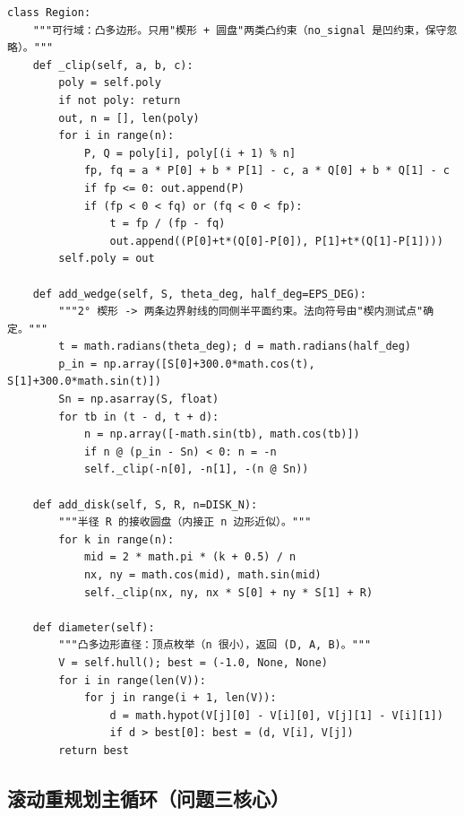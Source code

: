 \begin{verbatim}
class Region:
    """可行域：凸多边形。只用"楔形 + 圆盘"两类凸约束（no_signal 是凹约束，保守忽略）。"""
    def _clip(self, a, b, c):
        poly = self.poly
        if not poly: return
        out, n = [], len(poly)
        for i in range(n):
            P, Q = poly[i], poly[(i + 1) % n]
            fp, fq = a * P[0] + b * P[1] - c, a * Q[0] + b * Q[1] - c
            if fp <= 0: out.append(P)
            if (fp < 0 < fq) or (fq < 0 < fp):
                t = fp / (fp - fq)
                out.append((P[0]+t*(Q[0]-P[0]), P[1]+t*(Q[1]-P[1])))
        self.poly = out

    def add_wedge(self, S, theta_deg, half_deg=EPS_DEG):
        """2° 楔形 -> 两条边界射线的同侧半平面约束。法向符号由"楔内测试点"确定。"""
        t = math.radians(theta_deg); d = math.radians(half_deg)
        p_in = np.array([S[0]+300.0*math.cos(t), S[1]+300.0*math.sin(t)])
        Sn = np.asarray(S, float)
        for tb in (t - d, t + d):
            n = np.array([-math.sin(tb), math.cos(tb)])
            if n @ (p_in - Sn) < 0: n = -n
            self._clip(-n[0], -n[1], -(n @ Sn))

    def add_disk(self, S, R, n=DISK_N):
        """半径 R 的接收圆盘（内接正 n 边形近似）。"""
        for k in range(n):
            mid = 2 * math.pi * (k + 0.5) / n
            nx, ny = math.cos(mid), math.sin(mid)
            self._clip(nx, ny, nx * S[0] + ny * S[1] + R)

    def diameter(self):
        """凸多边形直径：顶点枚举（n 很小），返回 (D, A, B)。"""
        V = self.hull(); best = (-1.0, None, None)
        for i in range(len(V)):
            for j in range(i + 1, len(V)):
                d = math.hypot(V[j][0] - V[i][0], V[j][1] - V[i][1])
                if d > best[0]: best = (d, V[i], V[j])
        return best
\end{verbatim}

\subsection{滚动重规划主循环（问题三核心）}

